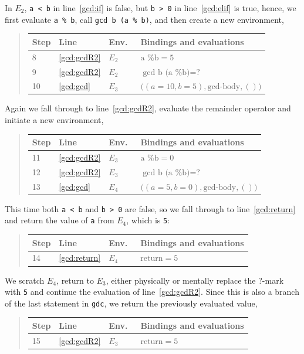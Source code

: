 \documentclass[fsharpNotes.tex]{subfiles}
\begin{document}
In $E_2$, \lstinline!a < b! in line~\ref{gcd:if} is false, but
\lstinline!b > 0! in line~\ref{gcd:elif} is true, hence, we first
evaluate \lstinline{a % b}, call \lstinline{gcd b (a % b)}, and then create a new environment,
\begin{quote}
  \begin{tabular*}{0.6\linewidth}{l|lll}
    Step & Line & Env.\ & Bindings and evaluations\\
    \hline
    8&\ref{gcd:gcdR2} & $E_2$ & $\text{a \% b} = 5$\\
    9&\ref{gcd:gcdR2} & $E_2$ & $\text{gcd b (a \% b)} = \text{?}$\\
    10&\ref{gcd:gcd} & $E_3$ &$\big((a = 10, b = 5), \text{gcd-body}, ()\big)$\\
  \end{tabular*}
\end{quote}
Again we fall through to line~\ref{gcd:gcdR2}, evaluate the remainder operator and initiate a new environment,
\begin{quote}
  \begin{tabular*}{0.6\linewidth}{l|lll}
    Step & Line & Env.\ & Bindings and evaluations\\
    \hline
    11&\ref{gcd:gcdR2} & $E_3$ & $\text{a \% b} = 0$\\
    12&\ref{gcd:gcdR2} & $E_3$ & $\text{gcd b (a \% b)} = \text{?}$\\
    13&\ref{gcd:gcd} & $E_4$ & $\big((a = 5, b = 0), \text{gcd-body}, ()\big)$\\
  \end{tabular*}
\end{quote}
This time both \lstinline!a < b! and \lstinline!b > 0! are false, so we fall through to line~\ref{gcd:return} and return the value of \lstinline!a! from $E_4$, which is \lstinline!5!:
\begin{quote}
  \begin{tabular*}{0.6\linewidth}{l|lll}
    Step & Line & Env.\ & Bindings and evaluations\\
    \hline
    14&\ref{gcd:return} & $E_4$ & $\text{return} = 5$\\
  \end{tabular*}
\end{quote}
We scratch $E_4$, return to $E_3$, either physically or mentally replace the ?-mark with \lstinline!5! and continue the evaluation of line~\ref{gcd:gcdR2}. Since this is also a branch of the last statement in \lstinline{gdc}, we return the previously evaluated value,
\begin{quote}
  \begin{tabular*}{0.6\linewidth}{l|lll}
    Step & Line & Env.\ & Bindings and evaluations\\
    \hline
    15&\ref{gcd:gcdR2} & $E_3$ & $\text{return} = 5$\\
  \end{tabular*}
\end{quote}
\end{document}
